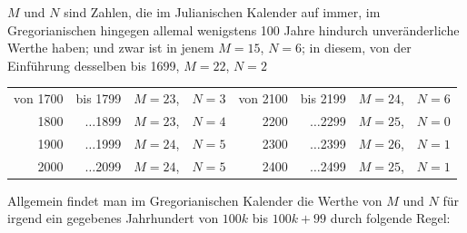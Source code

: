 $M$ und $N$ sind Zahlen, die im Julianischen Kalender auf immer, im Gregorianischen
hingegen allemal wenigstens 100 Jahre hindurch unveränderliche
Werthe haben; und zwar ist in jenem $M=15$, $N=6$; in diesem, von der Einführung
desselben bis 1699, $M=22$, $N=2$
\begin{center}\small
\setlength{\tabcolsep}{4.5pt}\begin{tabular}{rrll|rrll}
von 1700 & bis 1799 & $M=23$, & $N=3$ & von 2100 & bis 2199 & $M=24$, & $N=6$\\
1800 & $\ldots$1899 & $M=23$, & $N=4$ & 2200 & $\ldots$2299 & $M=25$, & $N=0$\\
1900 & $\ldots$1999 & $M=24$, & $N=5$ & 2300 & $\ldots$2399 & $M=26$, & $N=1$\\
2000 & $\ldots$2099 & $M=24$, & $N=5$ & 2400 & $\ldots$2499 & $M=25$, & $N=1$
\end{tabular}
\end{center}

Allgemein findet man im Gregorianischen Kalender die Werthe von $M$
und $N$ für irgend ein gegebenes Jahrhundert von $100k$ bis $100k+99$ durch
folgende Regel:

